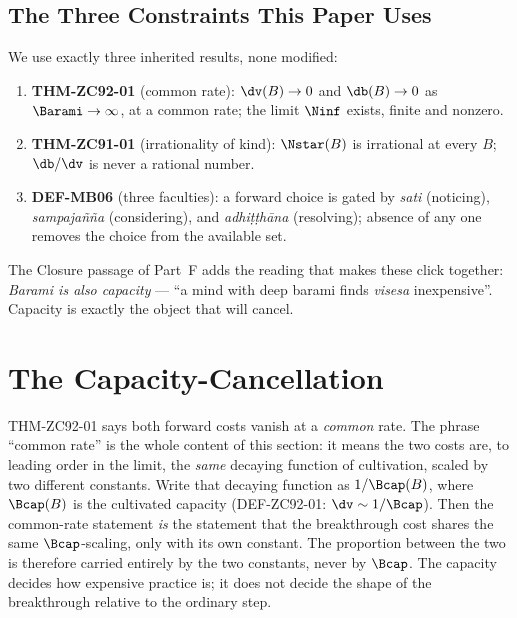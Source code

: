 \documentclass[12pt, a4paper]{article}
\begin{document}
\subsection{The Three Constraints This Paper Uses}

We use exactly three inherited results, none modified:
\begin{enumerate}[leftmargin=2em, noitemsep]
  \item \textbf{THM-ZC92-01} (common rate): $\dv(B)\to0$ and $\db(B)\to0$ as
    $\Barami\to\infty$, at a common rate; the limit $\Ninf$ exists, finite and
    nonzero.
  \item \textbf{THM-ZC91-01} (irrationality of kind): $\Nstar(B)$ is
    irrational at every $B$; $\db/\dv$ is never a rational number.
  \item \textbf{DEF-MB06} (three faculties): a forward choice is gated by
    \emph{sati} (noticing), \emph{sampaja\~n\~na} (considering), and
    \emph{adhi\d{t}\d{t}h\=ana} (resolving); absence of any one removes the
    choice from the available set.
\end{enumerate}
The Closure passage of Part~F adds the reading that makes these click
together: \emph{Barami is also capacity} --- ``a mind with deep barami finds
\emph{visesa} inexpensive''. Capacity is exactly the object that will cancel.

\section{The Capacity-Cancellation}
\label{sec:cancellation-zc93}

THM-ZC92-01 says both forward costs vanish at a \emph{common} rate. The phrase
``common rate'' is the whole content of this section: it means the two costs
are, to leading order in the limit, the \emph{same} decaying function of
cultivation, scaled by two different constants. Write that decaying function as
$1/\Bcap(B)$, where $\Bcap(B)$ is the cultivated capacity (DEF-ZC92-01:
$\dv\sim1/\Bcap$). Then the common-rate statement \emph{is} the statement that
the breakthrough cost shares the same $\Bcap$-scaling, only with its own
constant. The proportion between the two is therefore carried entirely by the
two constants, never by $\Bcap$. The capacity decides how expensive practice
is; it does not decide the shape of the breakthrough relative to the ordinary
step.
\end{document}
